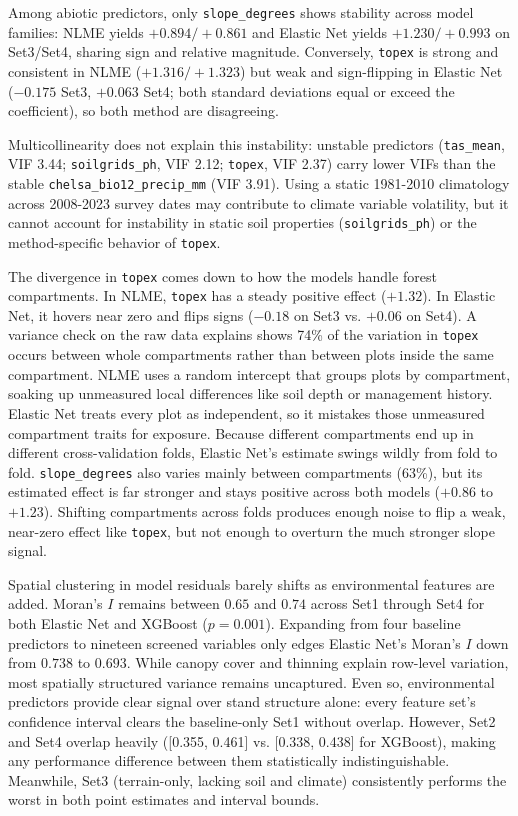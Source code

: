 \documentclass[logo,msc,ai]{infthesis}           %
\begin{document}
Among abiotic predictors, only \texttt{slope\_degrees} shows stability across model families: NLME yields $+0.894/+0.861$ and Elastic Net yields $+1.230/+0.993$ on Set3/Set4, sharing sign and relative magnitude. Conversely, \texttt{topex} is strong and consistent in NLME ($+1.316/+1.323$) but weak and sign-flipping in Elastic Net ($-0.175$ Set3, $+0.063$ Set4; both standard deviations equal or exceed the coefficient), so both method are disagreeing. 

Multicollinearity does not explain this instability: unstable predictors (\texttt{tas\_mean}, VIF 3.44; \texttt{soilgrids\_ph}, VIF 2.12; \texttt{topex}, VIF 2.37) carry lower VIFs than the stable \texttt{chelsa\_bio12\_precip\_mm} (VIF 3.91). Using a static 1981-2010 climatology across 2008-2023 survey dates may contribute to climate variable volatility, but it cannot account for instability in static soil properties (\texttt{soilgrids\_ph}) or the method-specific behavior of \texttt{topex}. 

The divergence in \texttt{topex} comes down to how the models handle forest compartments. In NLME, \texttt{topex} has a steady positive effect ($+1.32$). In Elastic Net, it hovers near zero and flips signs ($-0.18$ on Set3 vs. $+0.06$ on Set4). A variance check on the raw data explains shows 74\% of the variation in \texttt{topex} occurs between whole compartments rather than between plots inside the same compartment. NLME uses a random intercept that groups plots by compartment, soaking up unmeasured local differences like soil depth or management history. Elastic Net treats every plot as independent, so it mistakes those unmeasured compartment traits for exposure. Because different compartments end up in different cross-validation folds, Elastic Net's estimate swings wildly from fold to fold. \texttt{slope\_degrees} also varies mainly between compartments (63\%), but its estimated effect is far stronger and stays positive across both models ($+0.86$ to $+1.23$). Shifting compartments across folds produces enough noise to flip a weak, near-zero effect like \texttt{topex}, but not enough to overturn the much stronger slope signal.

Spatial clustering in model residuals barely shifts as environmental features are added. Moran's $I$ remains between $0.65$ and $0.74$ across Set1 through Set4 for both Elastic Net and XGBoost ($p = 0.001$). Expanding from four baseline predictors to nineteen screened variables only edges Elastic Net's Moran's $I$ down from $0.738$ to $0.693$. While canopy cover and thinning explain row-level variation, most spatially structured variance remains uncaptured. Even so, environmental predictors provide clear signal over stand structure alone: every feature set's confidence interval clears the baseline-only Set1 without overlap. However, Set2 and Set4 overlap heavily ([0.355, 0.461] vs. [0.338, 0.438] for XGBoost), making any performance difference between them statistically indistinguishable. Meanwhile, Set3 (terrain-only, lacking soil and climate) consistently performs the worst in both point estimates and interval bounds.
\end{document}
